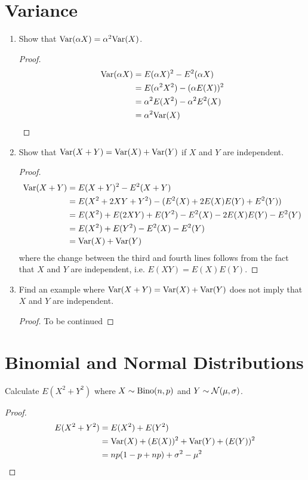 \documentclass{article}
\begin{document}
\section{Variance}
    \begin{enumerate}[label=\roman*)]
        \item Show that $\text{Var}(\alpha X) = \alpha^2\text{Var}(X)$.  
            \begin{proof}
                \begin{align*}
                    \text{Var}(\alpha X) &= E(\alpha X)^2 - E^2(\alpha X)\\
                    &= E(\alpha^2X^2) - (\alpha E(X))^2\\
                    &= \alpha^2E(X^2) - \alpha^2 E^2(X)\\
                    &= \alpha^2\text{Var}(X)
                \end{align*}
            \end{proof}
        \item Show that $\text{Var}(X + Y) = \text{Var}(X) + \text{Var}(Y)$ if $X$ and $Y$ are
        independent.
            \begin{proof}
                \begin{align*}
                    \text{Var}(X + Y) &= E(X + Y)^2 - E^2(X + Y)\\
                    &= E(X^2 + 2XY + Y^2) - (E^2(X) + 2E(X)E(Y) + E^2(Y))\\
                    &= E(X^2) + E(2XY) + E(Y^2) - E^2(X) - 2E(X)E(Y) - E^2(Y)\\
                    &= E(X^2) + E(Y^2) - E^2(X) - E^2(Y)\\
                    &= \text{Var}(X) + \text{Var}(Y)
                \end{align*} 
                where the change between the third and fourth lines follows from
                the fact that $X$ and $Y$ are independent, i.e. $E(XY) =
                E(X)E(Y)$.
            \end{proof}
        \item Find an example where $\text{Var}(X + Y) = \text{Var}(X) + \text{Var}(Y)$ does not
        imply that $X$ and $Y$ are independent. 
            \begin{proof}
                To be continued
            \end{proof}
    \end{enumerate}

\section{Binomial and Normal Distributions}
    Calculate $E(X^2 + Y^2)$ where $X \sim \text{Bino}(n, p)$ and $Y \sim
    \mathcal{N}(\mu,\sigma)$. 
    \begin{proof}
        \begin{align*}
            E(X^2 + Y^2) &= E(X^2) + E(Y^2)\\
            &= \text{Var}(X) + (E(X))^2 + \text{Var}(Y) + (E(Y))^2\\
            &= np(1-p+np) + \sigma^2 - \mu^2
        \end{align*}
    \end{proof}
\end{document}
